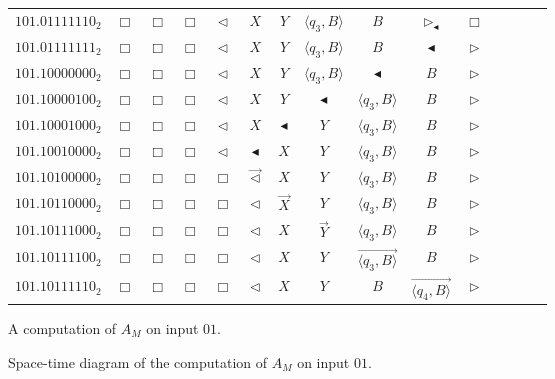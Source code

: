 \documentclass[pre,amssymb,showpacs,showkeys,preprint]{revtex4}
\begin{document}
\begin{figure}
\begin{center}
{\begin{tabular}{r|cccccccccccccc}
$101.01111110_2$ & $\Box$ & $\Box$ & $\Box$ & $\lhd$ & $X$ & $Y$ & $\langle q_3,B \rangle$ & $B$ & $\rhd_\blacktriangleleft$ & $\Box$ \\
$101.01111111_2$ & $\Box$ & $\Box$ & $\Box$ & $\lhd$ & $X$ & $Y$ & $\langle q_3,B \rangle$ & $B$ & $\blacktriangleleft$ & $\rhd$ \\
$101.10000000_2$ & $\Box$ & $\Box$ & $\Box$ & $\lhd$ & $X$ & $Y$ & $\langle q_3,B \rangle$ & $\blacktriangleleft$ & $B$ & $\rhd$ \\
$101.10000100_2$ & $\Box$ & $\Box$ & $\Box$ & $\lhd$ & $X$ & $Y$ & $\blacktriangleleft$ & $\langle q_3,B \rangle$ & $B$ & $\rhd$ \\
$101.10001000_2$ & $\Box$ & $\Box$ & $\Box$ & $\lhd$ & $X$ & $\blacktriangleleft$ & $Y$ & $\langle q_3,B \rangle$ & $B$ & $\rhd$ \\
$101.10010000_2$ & $\Box$ & $\Box$ & $\Box$ & $\lhd$ & $\blacktriangleleft$ & $X$ & $Y$ & $\langle q_3,B \rangle$ & $B$ & $\rhd$ \\
$101.10100000_2$ & $\Box$ & $\Box$ & $\Box$ & $\Box$ & $\overrightarrow{\lhd}$ & $X$ & $Y$ & $\langle q_3,B \rangle$ & $B$ & $\rhd$ \\
$101.10110000_2$ & $\Box$ & $\Box$ & $\Box$ & $\Box$ & $\lhd$ & $\overrightarrow{X}$ & $Y$ & $\langle q_3,B \rangle$ & $B$ & $\rhd$ \\
$101.10111000_2$ & $\Box$ & $\Box$ & $\Box$ & $\Box$ & $\lhd$ & $X$ & $\overrightarrow{Y}$ & $\langle q_3,B \rangle$ & $B$ & $\rhd$ \\
$101.10111100_2$ & $\Box$ & $\Box$ & $\Box$ & $\Box$ & $\lhd$ & $X$ & $Y$ & $\overrightarrow{\langle q_3,B \rangle}$ & $B$ & $\rhd$ \\
$101.10111110_2$ & $\Box$ & $\Box$ & $\Box$ & $\Box$ & $\lhd$ & $X$ & $Y$ & $B$ & $\overrightarrow{\langle q_4,B \rangle}$ & $\rhd$ \\
\end{tabular}
}
\end{center}
\caption{\label{fig:example-hyper-sca-2}A computation of $A_M$ on input $01$.}
\end{figure}


\begin{figure}
\begin{center}
\caption{\label{fig:evolution} Space-time diagram of the computation of $A_M$ on input $01$.}
\end{center}
\end{figure}
\end{document}
